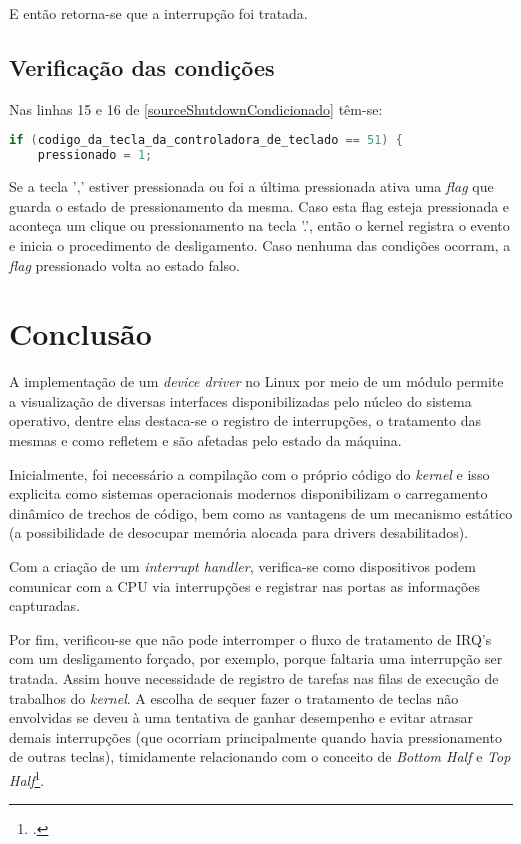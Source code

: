 \documentclass[
	12pt,			
	openright,			%
	twoside,			%
	a4paper,			%
	english,			%
	brazil,				%
	]{abntex2}
\begin{document}
E então retorna-se que a interrupção foi tratada.

\section{Verificação das condições}

Nas linhas 15 e 16 de \autoref{sourceShutdownCondicionado} têm-se:

\begin{lstlisting}[language=C]
  if (codigo_da_tecla_da_controladora_de_teclado == 51) {
    pressionado = 1;
\end{lstlisting}

Se a tecla ',' estiver pressionada ou foi a última pressionada ativa uma
\emph{flag} que guarda o estado de pressionamento da mesma. Caso esta flag
esteja pressionada e aconteça um clique ou pressionamento na tecla '.', então o
kernel registra o evento e inicia o procedimento de desligamento. Caso nenhuma
das condições ocorram, a \emph{flag} pressionado volta ao estado falso.

\chapter{Conclusão}

A implementação de um \emph{device driver} no Linux por meio de um módulo
permite a visualização de diversas interfaces disponibilizadas pelo núcleo do
sistema operativo, dentre elas destaca-se o registro de interrupções, o
tratamento das mesmas e como refletem e são afetadas pelo estado da máquina.

Inicialmente, foi necessário a compilação com o próprio código do \emph{kernel}
e isso explicita como sistemas operacionais modernos disponibilizam o
carregamento dinâmico de trechos de código, bem como as vantagens de um
mecanismo estático (a possibilidade de desocupar memória alocada para drivers
desabilitados).

Com a criação de um \emph{interrupt handler}, verifica-se como dispositivos
podem comunicar com a CPU via interrupções e registrar nas portas as informações
capturadas.

Por fim, verificou-se que não pode interromper o fluxo de tratamento de IRQ's
com um desligamento forçado, por exemplo, porque faltaria uma interrupção ser
tratada. Assim houve necessidade de registro de tarefas nas filas de execução 
de trabalhos do \emph{kernel}. A escolha de sequer fazer o tratamento de teclas
não envolvidas se deveu à uma tentativa de ganhar desempenho e evitar atrasar
demais interrupções (que ocorriam principalmente quando havia pressionamento de
outras teclas), timidamente relacionando com o conceito de \emph{Bottom Half} e
\emph{Top Half}\footcite{topbottomhalves}.
\end{document}
